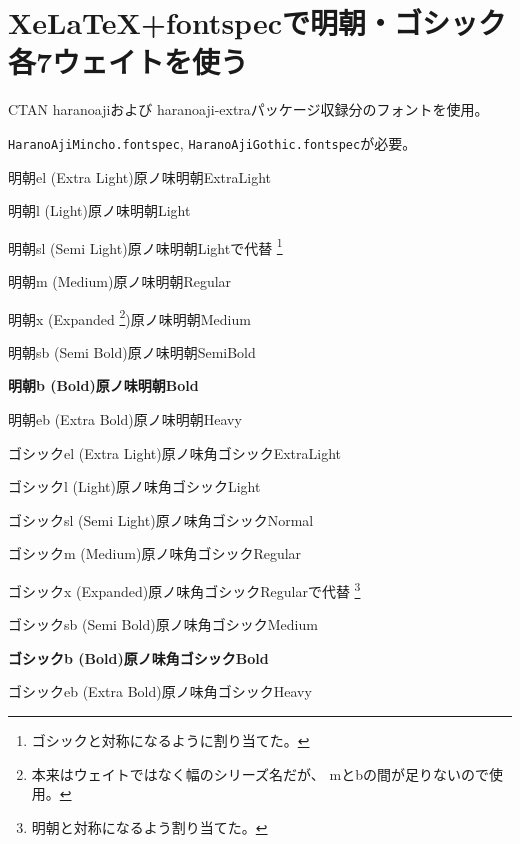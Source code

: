 \documentclass[xelatex,ja=standard]{bxjsarticle}
\begin{document}
\section{Xe\LaTeX +fontspecで明朝・ゴシック各7ウェイトを使う}

CTAN haranoajiおよび
haranoaji-extraパッケージ収録分のフォントを使用。

\texttt{HaranoAjiMincho.fontspec},
\texttt{HaranoAjiGothic.fontspec}が必要。

\vspace{\baselineskip}

\rmfamily
\mcfamily
{}\selectfont
明朝el (Extra Light)原ノ味明朝ExtraLight

\selectfont
明朝l (Light)原ノ味明朝Light

\selectfont
明朝sl (Semi Light)原ノ味明朝Lightで代替
\footnote{ゴシックと対称になるように割り当てた。}

\mdseries
明朝m (Medium)原ノ味明朝Regular

\selectfont
明朝x (Expanded%
\footnote{本来はウェイトではなく幅のシリーズ名だが、
  mとbの間が足りないので使用。})原ノ味明朝Medium

\selectfont
明朝sb (Semi Bold)原ノ味明朝SemiBold

\bfseries
明朝b (Bold)原ノ味明朝Bold

\selectfont
明朝eb (Extra Bold)原ノ味明朝Heavy

\sffamily
\gtfamily
{}\selectfont
ゴシックel (Extra Light)原ノ味角ゴシックExtraLight

\selectfont
ゴシックl (Light)原ノ味角ゴシックLight

\selectfont
ゴシックsl (Semi Light)原ノ味角ゴシックNormal

\mdseries
ゴシックm (Medium)原ノ味角ゴシックRegular

\selectfont
ゴシックx (Expanded)原ノ味角ゴシックRegularで代替
\footnote{明朝と対称になるよう割り当てた。}

\selectfont
ゴシックsb (Semi Bold)原ノ味角ゴシックMedium

\bfseries
ゴシックb (Bold)原ノ味角ゴシックBold

\selectfont
ゴシックeb (Extra Bold)原ノ味角ゴシックHeavy
\end{document}
